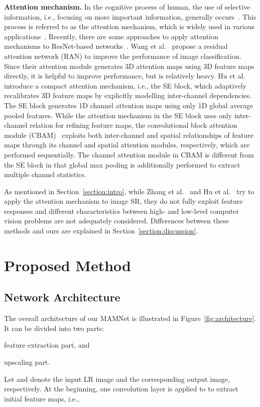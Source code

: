 \documentclass[final,5p,times,twocolumn]{elsarticle}
\begin{document}
\textbf{Attention mechanism.}
In the cognitive process of human, the use of selective information, i.e., focusing on more important information, generally occurs~\cite{mnih2014recurrent}.
This process is referred to as the attention mechanism, which is widely used in various applications~\cite{xu2015show,yao2015describing}.
Recently, there are some approaches to apply attention mechanisms to ResNet-based networks~\cite{wang2017residual,hu2018squeeze,woo2018cbam,zhang2018rcan,hu2018channel}.
Wang et al.~\cite{wang2017residual} propose a residual attention network (RAN) to improve the performance of image classification.
Since their attention module generates 3D attention maps using 3D feature maps directly, it is helpful to improve performance, but is relatively heavy.
Hu et al.~\cite{hu2018squeeze} introduce a compact attention mechanism, i.e., the SE block, which adaptively recalibrates 3D feature maps by explicitly modelling inter-channel dependencies.
The SE block generates 1D channel attention maps using only 1D global average pooled features.
While the attention mechanism in the SE block uses only inter-channel relation for refining feature maps, the convolutional block attention module (CBAM)~\cite{woo2018cbam} exploits both inter-channel and spatial relationships of feature maps through its channel and spatial attention modules, respectively, which are performed sequentially.
The channel attention module in CBAM is different from the SE block in that global max pooling is additionally performed to extract multiple channel statistics.


As mentioned in Section~\ref{section:intro}, while Zhang et al.~\cite{zhang2018rcan} and Hu et al.~\cite{hu2018channel} try to apply the attention mechanism to image SR, they do not fully exploit feature responses and different characteristics between high- and low-level computer vision problems are not adequately considered.
Differences between these methods and ours are explained in Section~\ref{section:discussion}. 













\section{Proposed Method}
\label{section:proposed methods}
\subsection{Network Architecture}
The overall architecture of our MAMNet is illustrated in Figure~\ref{fig:architecture}.
It can be divided into two parts: 
\begin{inparaenum}[1)]
	\item feature extraction part, and
	\item upscaling part.
\end{inparaenum}
Let  and  denote the input LR image and the corresponding output image, respectively.
At the beginning, one convolution layer is applied to  to extract initial feature maps, i.e.,
\end{document}
